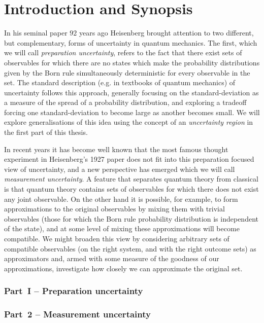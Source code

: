 \let\textcircled=\pgftextcircled
\chapter{Introduction and Synopsis}
\label{chap:intro}

In his seminal paper $92$ years ago Heisenberg brought attention to two different, but complementary, forms of uncertainty in quantum mechanics. The first, which we will call \emph{preparation uncertainty}, refers to the fact that there exist sets of observables for which there are no states which make the probability distributions given by the Born rule simultaneously deterministic for every observable in the set. The standard description (e.g.  in textbooks of quantum mechanics) of uncertainty follows this approach, generally focusing on the standard-deviation as a measure of the spread of a probability distribution, and exploring a tradeoff forcing one standard-deviation to become large as another becomes small. We will explore generalisations of this idea using the concept of an \emph{uncertainty region} in the first part of this thesis.

In recent years  it has become well known that the most famous thought experiment in Heisenberg's 1927 paper does not fit into this preparation focused view of uncertainty, and a new perspective has emerged which we will call \emph{measurement uncertainty}. A feature that separates quantum theory from classical is that quantum theory contains sets of observables for which there does not exist any joint observable. On the other hand it is possible, for example, to form approximations to the original observables by mixing them with trivial observables (those for which the Born rule probability distribution is independent of the state), and at some level of mixing these approximations will become compatible. We might broaden this view by considering arbitrary sets of compatible observables (on the right system, and with the right outcome sets) as approximators and, armed with some measure of the goodness of our approximations, investigate how closely we can approximate the original set.


\subsection*{Part~I -- Preparation uncertainty}



\subsection*{Part~2 -- Measurement uncertainty}

